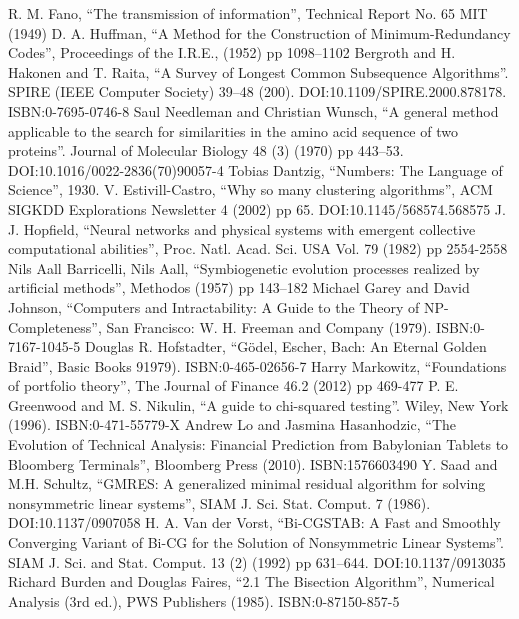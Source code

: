 \documentclass[justified,sixbynine]{tufte-book}
\theoremstyle{plain}%
\theoremstyle{definition}
\theoremstyle{remark}
\begin{document}
\begin{thebibliography}{999}
 R. M. Fano, ``The transmission of information'', Technical Report No. 65 MIT (1949)
 D. A. Huffman, ``A Method for the Construction of Minimum-Redundancy Codes'', Proceedings of the I.R.E., (1952) pp 1098–1102
 Bergroth and H. Hakonen and T. Raita, ``A Survey of Longest Common Subsequence Algorithms''. SPIRE (IEEE Computer Society) 39–48 (200). DOI:10.1109/SPIRE.2000.878178. ISBN:0-7695-0746-8
 Saul Needleman and Christian Wunsch, ``A general method applicable to the search for similarities in the amino acid sequence of two proteins''. Journal of Molecular Biology 48 (3) (1970) pp 443–53. DOI:10.1016/0022-2836(70)90057-4
 Tobias Dantzig, ``Numbers: The Language of Science'', 1930.
 V. Estivill-Castro, ``Why so many clustering algorithms'', ACM SIGKDD Explorations Newsletter 4 (2002) pp 65. DOI:10.1145/568574.568575
 J. J. Hopfield, ``Neural networks and physical systems with emergent collective computational abilities'', Proc. Natl. Acad. Sci. USA Vol. 79 (1982) pp 2554-2558
 Nils Aall Barricelli, Nils Aall, ``Symbiogenetic evolution processes realized by artificial methods'', Methodos (1957) pp 143–182
 Michael Garey and David Johnson, ``Computers and Intractability: A Guide to the Theory of NP-Completeness'', San Francisco: W. H. Freeman and Company (1979). ISBN:0-7167-1045-5
 Douglas R. Hofstadter, ``Gödel, Escher, Bach: An Eternal Golden Braid'', Basic Books 91979). ISBN:0-465-02656-7
 Harry Markowitz, ``Foundations of portfolio theory'', The Journal of Finance 46.2 (2012) pp 469-477
 P. E. Greenwood and M. S. Nikulin, ``A guide to chi-squared testing''. Wiley, New York (1996). ISBN:0-471-55779-X
 Andrew Lo and Jasmina Hasanhodzic, ``The Evolution of Technical Analysis: Financial Prediction from Babylonian Tablets to Bloomberg Terminals'', Bloomberg Press (2010). ISBN:1576603490
 Y. Saad and M.H. Schultz, ``GMRES: A generalized minimal residual algorithm for solving nonsymmetric linear systems'', SIAM J. Sci. Stat. Comput. 7 (1986). DOI:10.1137/0907058
 H. A. Van der Vorst, ``Bi-CGSTAB: A Fast and Smoothly Converging Variant of Bi-CG for the Solution of Nonsymmetric Linear Systems''. SIAM J. Sci. and Stat. Comput. 13 (2) (1992) pp 631–644. DOI:10.1137/0913035
 Richard Burden and Douglas Faires, ``2.1 The Bisection Algorithm'', Numerical Analysis (3rd ed.), PWS Publishers (1985). ISBN:0-87150-857-5

\end{thebibliography}
\end{document}
